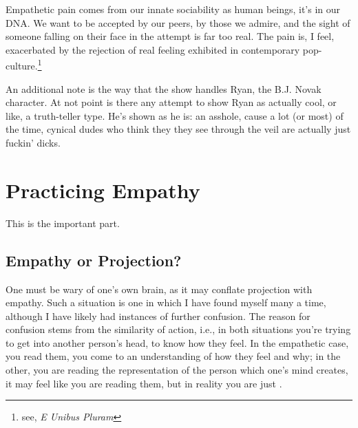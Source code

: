 \documentclass[../butidigress.tex]{subfiles}
\begin{document}
Empathetic pain comes from our innate sociability as human beings, it's in our DNA.
We want to be accepted by our peers, by those we admire, and the sight of someone falling on their face in the attempt is far too real.
The pain is, I feel, exacerbated by the rejection of real feeling exhibited in contemporary pop-culture.\footnote{see, \textit{E Unibus Pluram}}

An additional note is the way that the show handles Ryan, the B.J. Novak character.
At not point is there any attempt to show Ryan as actually cool, or like, a truth-teller type.
He's shown as he is: an asshole, cause a lot (or most) of the time, cynical dudes who think they they see through the veil are actually just fuckin' dicks.

\section{Practicing Empathy}
This is the important part.


\subsection{Empathy or Projection?}
One must be wary of one's own brain, as it may conflate projection with empathy.
Such a situation is one in which I have found myself many a time, although I have likely had instances of further confusion.
The reason for confusion stems from the similarity of action, i.e., in both situations you're trying to get into another person's head, to know how they feel.
In the empathetic case, you read them, you come to an understanding of how they feel and why; in the other, you are reading the representation of the person which one's mind creates, it may feel like you are reading them, but in reality you are just .
\end{document}
